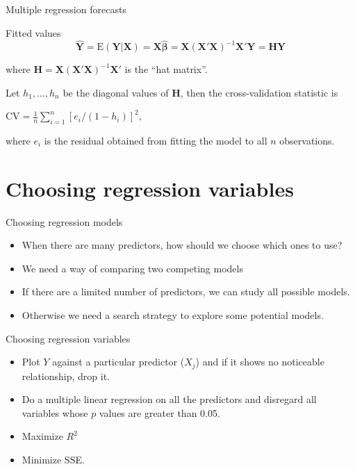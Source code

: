 \documentclass[14pt]{beamer}
\makeatletter
\def\biz{\begin{itemize}[<+-| alert@+>]}
\def\eiz{\end{itemize}}
\makeatother
\begin{document}
\begin{frame}{Multiple regression forecasts}


\begin{block}{Fitted values}\vspace*{-0.7cm}
\[
\hat{\bm{Y}} =
\text{E}(\bm{Y}|\bm{X}) =
\bm{X}\hat{\bm{\beta}} = \bm{X}(\bm{X}'\bm{X})^{-1}\bm{X}'\bm{Y} = \bm{H}\bm{Y}
\]
\end{block}
where $\bm{H} = \bm{X}(\bm{X}'\bm{X})^{-1}\bm{X}'$ is the ``hat matrix''.\pause


Let $h_1,\dots,h_n$ be the diagonal values of $\bm{H}$, then the cross-validation statistic is
\begin{block}{}
\centerline{$\displaystyle
\text{CV} = \frac1n\sum_{i=1}^n[e_i/(1-h_i)]^2,$}
\end{block}
where $e_i$ is the residual obtained from fitting the model to all $n$ observations.


\end{frame}



\section{Choosing regression variables}

\begin{frame}{Choosing regression models}
\biz
\item When there are many predictors, how should we choose which ones to use?

\item We need a way of comparing two competing models

\item If there are a limited number of predictors, we can study all possible models.

\item Otherwise we need a search strategy to explore some potential models.
\eiz

\end{frame}


\begin{frame}{Choosing regression variables}


\biz
\item Plot $Y$ against a particular predictor ($X_j$)
       and if it shows no noticeable relationship,  drop it.


\item Do a multiple linear regression on all the predictors
      and
      disregard all variables whose  $p$ values are greater than 0.05.

\item Maximize $R^2$

\item Minimize SSE.
\eiz
\end{frame}%
\end{document}
